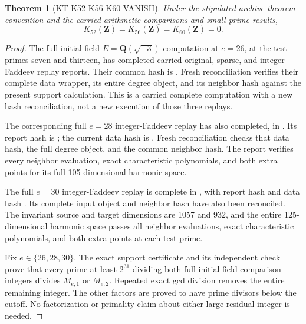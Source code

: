 \documentclass[11pt,a4paper]{article}
\newtheorem{theorem}{Theorem}[section]
\theoremstyle{definition}
\begin{document}
\begin{theorem}[KT-K52-K56-K60-VANISH]
\label{thm:kt-k52-k56-k60-vanish}
Under the stipulated archive-theorem convention and the carried
arithmetic comparisons and small-prime results,
\[
       K_{52}(\mathbf Z)=K_{56}(\mathbf Z)=K_{60}(\mathbf Z)=0.
\]
\end{theorem}
\begin{proof}
The full initial-field $E=\mathbf Q(\sqrt{-3})$ computation at
$e=26$, at the test primes seven and thirteen, has completed
carried original, sparse, and integer-Faddeev replay reports.
Their common hash is
.
Fresh reconciliation verifies their complete data wrapper, its
entire degree object, and its neighbor hash against the present
support calculation.  This is a carried complete computation
with a new hash reconciliation, not a new execution of those
three replays.

The corresponding full $e=28$ integer-Faddeev replay has also
completed, in .  Its report hash is
;
the current data hash is
.
Fresh reconciliation checks that data hash, the full degree
object, and the common neighbor hash.  The report verifies every
neighbor evaluation, exact characteristic polynomials, and both
extra points for its full 105-dimensional harmonic space.

The full $e=30$ integer-Faddeev replay is complete in
, with report hash
and data hash
.
Its complete input object and neighbor hash have also been
reconciled.  The invariant source and target dimensions are
1057 and 932, and the entire 125-dimensional harmonic space
passes all neighbor evaluations, exact characteristic
polynomials, and both extra points at each test prime.

Fix $e\in\{26,28,30\}$.
The exact support certificate and its independent check prove
that every prime at least $2^{31}$ dividing both full
initial-field comparison integers divides $M_{e,1}$ or
$M_{e,2}$.  Repeated exact gcd division removes the entire
remaining integer.  The other factors are proved to have
prime divisors below the cutoff.  No factorization or primality
claim about either large residual integer is needed.


\end{proof}
\end{document}
